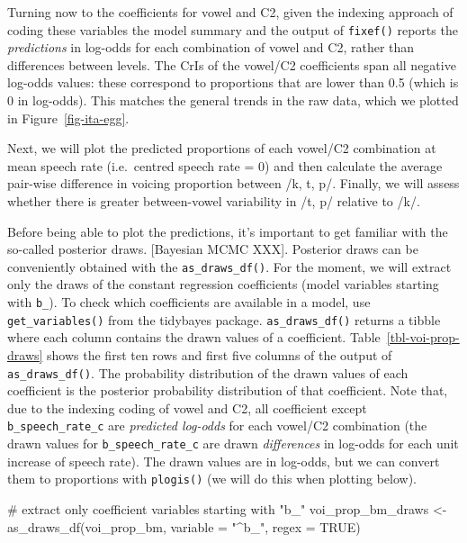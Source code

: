 \documentclass[
  authoryear,
  preprint,
  3p]{elsarticle}
\newenvironment{Shaded}{\begin{snugshade}}{\end{snugshade}}
\newcommand{\AttributeTok}[1]{\textcolor[rgb]{0.40,0.45,0.13}{#1}}
\newcommand{\CommentTok}[1]{\textcolor[rgb]{0.37,0.37,0.37}{#1}}
\newcommand{\ConstantTok}[1]{\textcolor[rgb]{0.56,0.35,0.01}{#1}}
\newcommand{\FunctionTok}[1]{\textcolor[rgb]{0.28,0.35,0.67}{#1}}
\newcommand{\NormalTok}[1]{\textcolor[rgb]{0.00,0.23,0.31}{#1}}
\newcommand{\OtherTok}[1]{\textcolor[rgb]{0.00,0.23,0.31}{#1}}
\newcommand{\StringTok}[1]{\textcolor[rgb]{0.13,0.47,0.30}{#1}}
\begin{document}
Turning now to the coefficients for vowel and C2, given the indexing
approach of coding these variables the model summary and the output of
\texttt{fixef()} reports the \emph{predictions} in log-odds for each
combination of vowel and C2, rather than differences between levels. The
CrIs of the vowel/C2 coefficients span all negative log-odds values:
these correspond to proportions that are lower than 0.5 (which is 0 in
log-odds). This matches the general trends in the raw data, which we
plotted in Figure~\ref{fig-ita-egg}.

Next, we will plot the predicted proportions of each vowel/C2
combination at mean speech rate (i.e.~centred speech rate = 0) and then
calculate the average pair-wise difference in voicing proportion between
/k, t, p/. Finally, we will assess whether there is greater
between-vowel variability in /t, p/ relative to /k/.

Before being able to plot the predictions, it's important to get
familiar with the so-called posterior draws. {[}Bayesian MCMC XXX{]}.
Posterior draws can be conveniently obtained with the
\texttt{as\_draws\_df()}. For the moment, we will extract only the draws
of the constant regression coefficients (model variables starting with
\texttt{b\_}). To check which coefficients are available in a model, use
\texttt{get\_variables()} from the tidybayes package.
\texttt{as\_draws\_df()} returns a tibble where each column contains the
drawn values of a coefficient. Table~\ref{tbl-voi-prop-draws} shows the
first ten rows and first five columns of the output of
\texttt{as\_draws\_df()}. The probability distribution of the drawn
values of each coefficient is the posterior probability distribution of
that coefficient. Note that, due to the indexing coding of vowel and C2,
all coefficient except \texttt{b\_speech\_rate\_c} are \emph{predicted
log-odds} for each vowel/C2 combination (the drawn values for
\texttt{b\_speech\_rate\_c} are drawn \emph{differences} in log-odds for
each unit increase of speech rate). The drawn values are in log-odds,
but we can convert them to proportions with \texttt{plogis()} (we will
do this when plotting below).

\begin{Shaded}
\begin{Highlighting}[]
\CommentTok{\# extract only coefficient variables starting with "b\_"}
\NormalTok{voi\_prop\_bm\_draws }\OtherTok{\textless{}{-}} \FunctionTok{as\_draws\_df}\NormalTok{(voi\_prop\_bm, }\AttributeTok{variable =} \StringTok{"\^{}b\_"}\NormalTok{, }\AttributeTok{regex =} \ConstantTok{TRUE}\NormalTok{)}
\end{Highlighting}
\end{Shaded}
\end{document}
